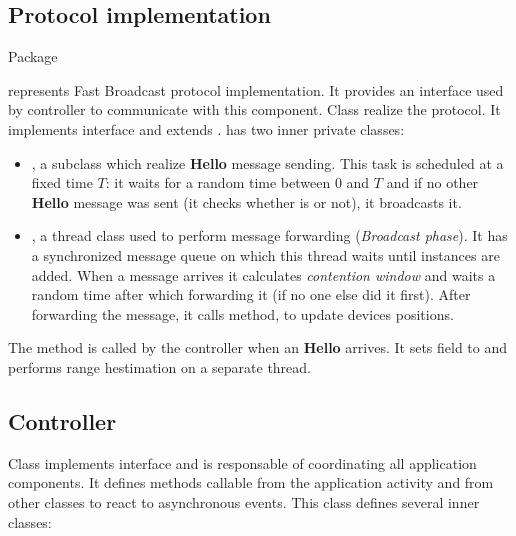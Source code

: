 \subsection{Protocol implementation}

Package \begin{center}\end{center} represents Fast Broadcast protocol implementation. It provides an interface  used by controller to communicate with this component. Class  realize the protocol. It implements  interface and extends .  has two inner private classes:
\begin{itemize}
	\item {}, a  subclass which realize \textbf{Hello} message sending. This task is scheduled at a fixed time $T$: it waits for a random time between $0$ and $T$ and if no other \textbf{Hello} message was sent (it checks whether  is  or not), it broadcasts it.
	\item {}, a thread class used to perform message forwarding (\textit{Broadcast phase}). It has a synchronized message queue on which this thread waits until  instances are added. When a message arrives it calculates \textit{contention window} and waits a random time after which forwarding it (if no one else did it first). After forwarding the message, it calls  method, to update devices positions.
\end{itemize} 

The method  is called by the controller when an \textbf{Hello} arrives. It sets  field to  and performs range hestimation on a separate thread.

\subsection{Controller}

Class  implements  interface and is responsable of coordinating all application components. It defines methods callable from the application activity and from other classes to react to asynchronous events. This class defines several inner classes:
